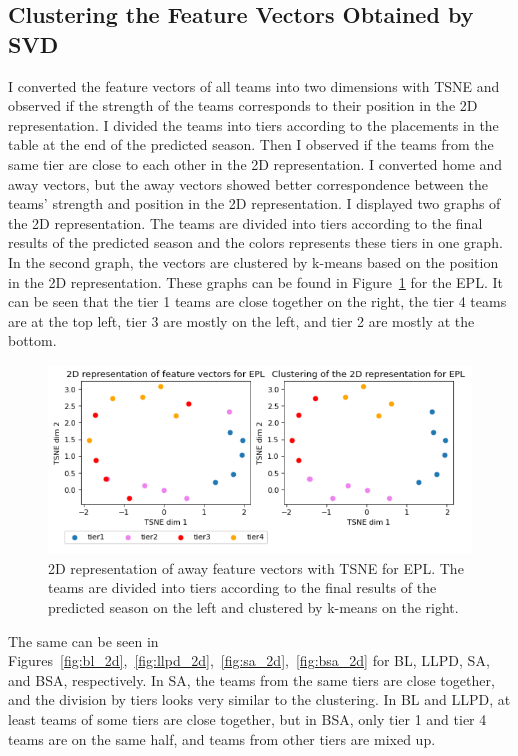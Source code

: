 \documentclass[thesis=M,english]{FITthesis}[2019/12/23]
\begin{document}
\subsection{Clustering the Feature Vectors Obtained by SVD}
\label{clustering}
I converted the feature vectors of all teams into two dimensions with TSNE and observed if the strength of the teams corresponds to their position in the 2D representation. I divided the teams into tiers according to the placements in the table at the end of the predicted season. Then I observed if the teams from the same tier are close to each other in the 2D representation. I converted home and away vectors, but the away vectors showed better correspondence between the teams' strength and position in the 2D representation. I displayed two graphs of the 2D representation. The teams are divided into tiers according to the final results of the predicted season and the colors represents these tiers in one graph. In the second graph, the vectors are clustered by k-means based on the position in the 2D representation. These graphs can be found in Figure~\ref{fig:epl_2d} for the EPL. It can be seen that the tier 1 teams are close together on the right, the tier 4 teams are at the top left, tier 3 are mostly on the left, and tier 2 are mostly at the bottom.
\begin{figure}[h]
    \centering
    \includegraphics[width=1\textwidth]{figures/2d_epl.png}
    \caption{2D representation of away feature vectors with TSNE for EPL. The teams are divided into tiers according to the final results of the predicted season on the left and clustered by k-means on the right.}
    \label{fig:epl_2d}
\end{figure}

The same can be seen in Figures~\ref{fig:bl_2d},~\ref{fig:llpd_2d},~\ref{fig:sa_2d},~\ref{fig:bsa_2d} for BL, LLPD, SA, and BSA, respectively. In SA, the teams from the same tiers are close together, and the division by tiers looks very similar to the clustering. In BL and LLPD, at least teams of some tiers are close together, but in BSA, only tier 1 and tier 4 teams are on the same half, and teams from other tiers are mixed up.
\end{document}
